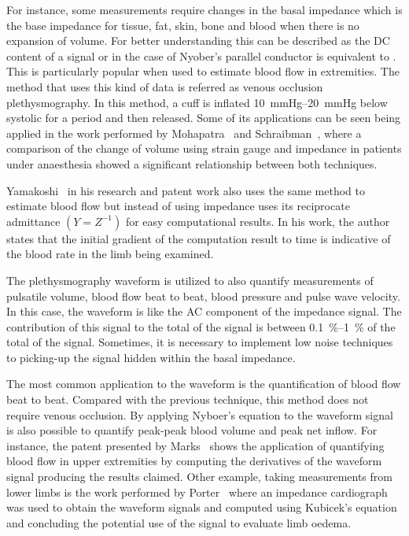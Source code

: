 For instance, some measurements require changes in the basal impedance which is the base impedance for tissue, fat, skin, bone and blood when there is no expansion of volume. For better understanding this can be described as the DC content of a signal or in the case of Nyober's parallel conductor is equivalent to . This is particularly popular when used to estimate blood flow in extremities. The method that uses this kind of data is referred as venous occlusion plethysmography. In this method, a cuff is inflated \SIrange{10}{20}{\mmHg} below systolic for a period and then released. Some of its applications can be seen being applied in the work performed by Mohapatra~\cite{mohapatra1979measurement} and Schraibman~\cite{schraibman1975comparison}, where a comparison of the change of volume using strain gauge and impedance in patients under anaesthesia showed a significant relationship between both techniques.

Yamakoshi~\cite{shimazu1982evaluation,yamakoshi1980limb,yamakoshi1978admittance}  in his research and patent work also uses the same method to estimate blood flow but instead of using impedance uses its reciprocate admittance $(Y=Z^{-1})$ for easy computational results. In his work, the author states that the initial gradient of the computation result to time is indicative of the blood rate in the limb being examined.
 
The plethysmography waveform is utilized to also quantify measurements of pulsatile volume, blood flow beat to beat, blood pressure and pulse wave velocity. In this case, the waveform is like the AC component of the impedance signal. The contribution of this signal to the total of the signal is between \SIrange{0.1}{1}{\percent} of the total of the signal. Sometimes, it is necessary to implement low noise techniques to picking-up the signal hidden within the basal impedance. 

The most common application to the waveform is the quantification of blood flow beat to beat. Compared with the previous technique, this method does not require venous occlusion. By applying Nyboer's equation to the waveform signal is also possible to quantify peak-peak blood volume and peak net inflow. For instance, the patent presented by Marks~\cite{marks1985computer} shows the application of quantifying blood flow in upper extremities by computing the derivatives of the waveform signal producing the results claimed. Other example, taking measurements from lower limbs is the work performed by Porter~\cite{porter1985measurement} where an impedance cardiograph was used to obtain the waveform signals and computed using Kubicek's equation and concluding the potential use of the signal to evaluate limb oedema. 


